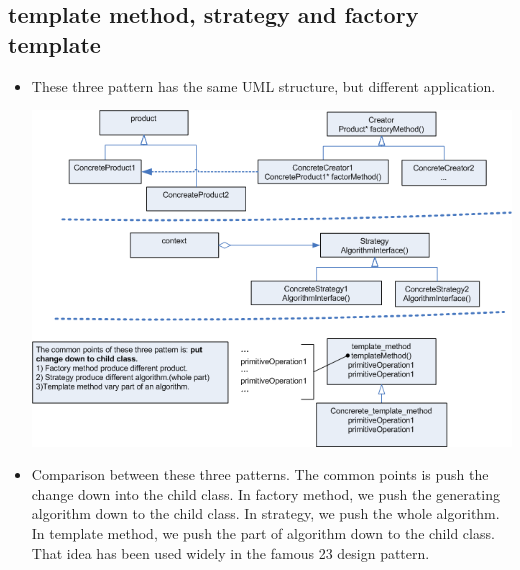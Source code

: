 \documentclass[a4paper,11pt,twoside]{book}
\begin{document}
\subsection{template method, strategy and factory template}
\begin{itemize}
	\item These three pattern has the same UML structure, but different application.
	
\begin{center}
	\includegraphics[width=0.93\linewidth]{pics/template_method.png}
\end{center}

	\item Comparison between these three patterns. The common points is push the change down into the child class. In factory method, we push the generating algorithm down to the child class. In strategy, we push the whole algorithm. In template method, we push the part of algorithm down to the child class. That idea has been used widely in the famous 23 design pattern. 
	 
\end{itemize}
\end{document}
